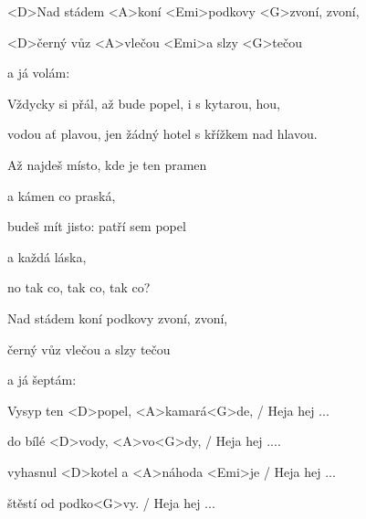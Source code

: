 

\zs
<D>Nad stádem <A>koní <Emi>podkovy <G>zvoní, zvoní,

<D>černý vůz <A>vlečou <Emi>a slzy <G>tečou

a já volám:
\ks

\zs
{}
\ks

\zs
Vždycky si přál, až bude popel, i s kytarou, hou,

vodou ať plavou, jen žádný hotel s křížkem nad hlavou.
\ks

\zs
Až najdeš místo, kde je ten pramen

a kámen co praská,

budeš mít jisto: patří sem popel

a každá láska,

no tak co, tak co, tak co?
\ks

\zs
Nad stádem koní podkovy zvoní, zvoní,

černý vůz vlečou a slzy tečou

a já šeptám:
\ks

\zs
{}
\ks

\zs
Vysyp ten <D>popel, <A>kamará<G>de, / Heja hej ...

do bílé <D>vody, <A>vo<G>dy, / Heja hej ....

vyhasnul <D>kotel a <A>náhoda <Emi>je / Heja hej ...

štěstí od podko<G>vy. / Heja hej ...
\ks

\kp
